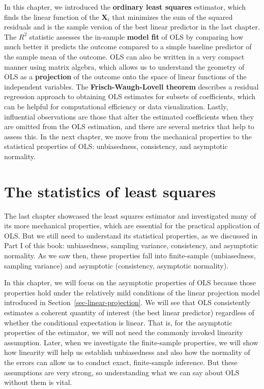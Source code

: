 \documentclass[
  13pt,
  letterpaper,
  DIV=11,
  numbers=noendperiod]{scrreprt}
\newcommand{\mb}{\bm}
\newcommand{\X}{\mb{X}}
\theoremstyle{plain}
\theoremstyle{plain}
\theoremstyle{definition}
\theoremstyle{definition}
\theoremstyle{remark}
\begin{document}
In this chapter, we introduced the \textbf{ordinary least squares}
estimator, which finds the linear function of the \(\X_i\) that
minimizes the sum of the squared residuals and is the sample version of
the best linear predictor in the last chapter. The \(R^2\) statistic
assesses the in-sample \textbf{model fit} of OLS by comparing how much
better it predicts the outcome compared to a simple baseline predictor
of the sample mean of the outcome. OLS can also be written in a very
compact manner using matrix algebra, which allows us to understand the
geometry of OLS as a \textbf{projection} of the outcome onto the space
of linear functions of the independent variables. The
\textbf{Frisch-Waugh-Lovell theorem} describes a residual regression
approach to obtaining OLS estimates for subsets of coefficients, which
can be helpful for computational efficiency or data visualization.
Lastly, influential observations are those that alter the estimated
coefficients when they are omitted from the OLS estimation, and there
are several metrics that help to assess this. In the next chapter, we
move from the mechanical properties to the statistical properties of
OLS: unbiasedness, consistency, and asymptotic normality.

\chapter{The statistics of least squares}\label{sec-ols-statistics}

The last chapter showcased the least squares estimator and investigated
many of its more mechanical properties, which are essential for the
practical application of OLS. But we still need to understand its
statistical properties, as we discussed in Part I of this book:
unbiasedness, sampling variance, consistency, and asymptotic normality.
As we saw then, these properties fall into finite-sample (unbiasedness,
sampling variance) and asymptotic (consistency, asymptotic normality).

In this chapter, we will focus on the asymptotic properties of OLS
because those properties hold under the relatively mild conditions of
the linear projection model introduced in
Section~\ref{sec-linear-projection}. We will see that OLS consistently
estimates a coherent quantity of interest (the best linear predictor)
regardless of whether the conditional expectation is linear. That is,
for the asymptotic properties of the estimator, we will not need the
commonly invoked linearity assumption. Later, when we investigate the
finite-sample properties, we will show how linearity will help us
establish unbiasedness and also how the normality of the errors can
allow us to conduct exact, finite-sample inference. But these
assumptions are very strong, so understanding what we can say about OLS
without them is vital.
\end{document}
